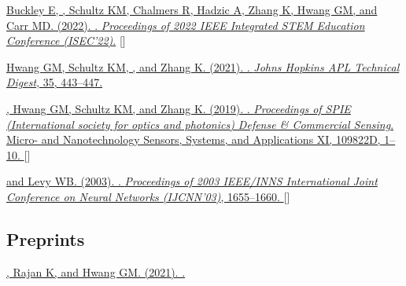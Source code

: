 \begin{description}
  \item \href{https://jdmonaco.com/files/buckley-2022-ISEC-author.pdf} {Buckley
      E, , Schultz KM, Chalmers R, Hadzic A, Zhang K, Hwang GM,
      and Carr MD. (2022). . \emph{Proceedings
    of 2022 IEEE Integrated STEM Education Conference (ISEC'22)}.}
    []
  \item \href{https://www.jhuapl.edu/Content/techdigest/pdf/V35-N04/35-04-Hwang.pdf}
    {Hwang GM, Schultz KM, , and Zhang K. (2021).
      . \emph{Johns Hopkins
    APL Technical Digest}, 35, 443--447.}
  \item \href{https://dx.doi.org/10.1117/12.2518966}
    {, Hwang GM, Schultz KM, and Zhang K. (2019).
      . \emph{Proceedings of SPIE (International society
      for optics and photonics) Defense \& Commercial Sensing}. Micro- and
      Nanotechnology Sensors, Systems, and Applications XI, 109822D, 1--10.
    }
    [\href{https://jdmonaco.com/files/monaco-SPIE2019-cognitive-swarming.pdf}{}]
  \item \href{https://dx.doi.org/10.1109/IJCNN.2003.1223655}
      { and Levy WB. (2003). . \emph{Proceedings of 2003 IEEE/INNS
        International Joint Conference on Neural Networks (IJCNN'03)}, 1655--1660.
      }
      [\href{https://jdmonaco.com/files/monaco-2003-tmaze.pdf}{}]
\end{description}

\subsection*{Preprints}
\label{sec:preprints}

\begin{description}
  \item \href{https://arxiv.org/abs/2105.07284}
    {, Rajan K, and Hwang GM. (2021). .
    }
\end{description}

